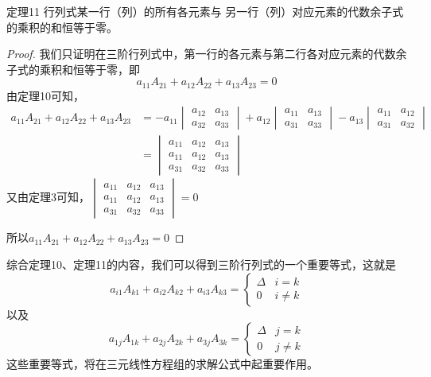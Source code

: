 \begin{blk}{定理11}
    行列式某一行（列）的所有各元素与 另一行（列）对应元素的代数余子式的乘积的和恒等于零。
\end{blk}

\begin{proof}
    我们只证明在三阶行列式中，第一行的各元素与第二行各对应元素的代数余子式的乘积和恒等于零，即
\[a_{11}A_{21}+a_{12}A_{22}+a_{13}A_{23}=0\]
由定理10可知，
\[\begin{split}
    a_{11}A_{21}+a_{12}A_{22}+a_{13}A_{23}
&=-a_{11}\begin{vmatrix}
    a_{12}&a_{13}\\a_{32}&a_{33}
\end{vmatrix}+a_{12}\begin{vmatrix}
    a_{11}&a_{13}\\a_{31}&a_{33}
\end{vmatrix}-a_{13}\begin{vmatrix}
    a_{11}&a_{12}\\a_{31}&a_{32}
\end{vmatrix}\\
&=\begin{vmatrix}
  a_{11}&  a_{12}&a_{13}\\a_{11}&  a_{12}&a_{13} \\a_{31}&a_{32}&a_{33}
\end{vmatrix}
\end{split}\]
又由定理3可知，$\begin{vmatrix}
    a_{11}&  a_{12}&a_{13}\\a_{11}&  a_{12}&a_{13} \\a_{31}&a_{32}&a_{33}
  \end{vmatrix}=0$
  
  所以$a_{11}A_{21}+a_{12}A_{22}+a_{13}A_{23}=0$
\end{proof}

综合定理10、定理11的内容，我们可以得到三阶行列式的一个重要等式，这就是
\[a_{i1}A_{k1}+a_{i2}A_{k2}+a_{i3}A_{k3}=\begin{cases}
    \Delta & i=k\\
    0 & i\ne k
\end{cases}\]
以及
\[a_{1j}A_{1k}+a_{2j}A_{2k}+a_{3j}A_{3k}=\begin{cases}
    \Delta & j=k\\
    0 & j\ne k
\end{cases}\]
这些重要等式，将在三元线性方程组的求解公式中起重要作用。

